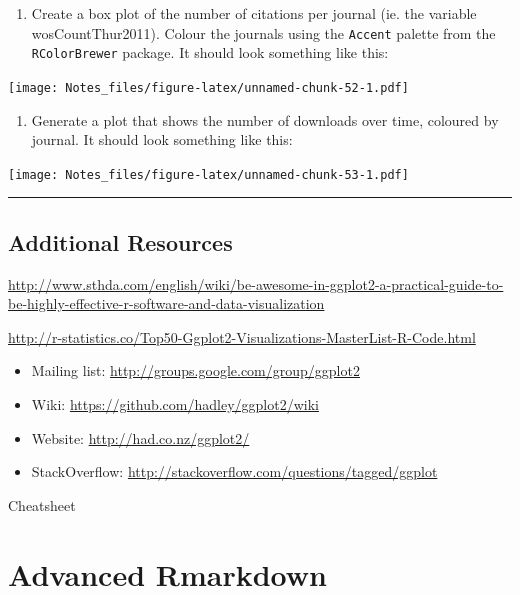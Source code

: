 \documentclass[
]{book}
\providecommand{\tightlist}{%
  \setlength{\itemsep}{0pt}\setlength{\parskip}{0pt}}
\begin{document}
\begin{enumerate}
\def\labelenumi{\arabic{enumi}.}
\setcounter{enumi}{2}
\tightlist
\item
  Create a box plot of the number of citations per journal (ie. the variable wosCountThur2011). Colour the journals using the \texttt{Accent} palette from the \texttt{RColorBrewer} package. It should look something like this:
\end{enumerate}

\texttt{[image: Notes\_files/figure-latex/unnamed-chunk-52-1.pdf]}

\begin{enumerate}
\def\labelenumi{\arabic{enumi}.}
\setcounter{enumi}{3}
\tightlist
\item
  Generate a plot that shows the number of downloads over time, coloured by journal. It should look something like this:
\end{enumerate}

\texttt{[image: Notes\_files/figure-latex/unnamed-chunk-53-1.pdf]}

\begin{center}\rule{0.5\linewidth}{0.5pt}\end{center}

\hypertarget{additional-resources}{%
\section{Additional Resources}\label{additional-resources}}

\url{http://www.sthda.com/english/wiki/be-awesome-in-ggplot2-a-practical-guide-to-be-highly-effective-r-software-and-data-visualization}

\url{http://r-statistics.co/Top50-Ggplot2-Visualizations-MasterList-R-Code.html}

\begin{itemize}
\tightlist
\item
  Mailing list: \url{http://groups.google.com/group/ggplot2}
\item
  Wiki: \url{https://github.com/hadley/ggplot2/wiki}
\item
  Website: \url{http://had.co.nz/ggplot2/}
\item
  StackOverflow: \url{http://stackoverflow.com/questions/tagged/ggplot}
\end{itemize}

Cheatsheet

\hypertarget{advanced-rmarkdown}{%
\chapter{Advanced Rmarkdown}\label{advanced-rmarkdown}}
\end{document}

